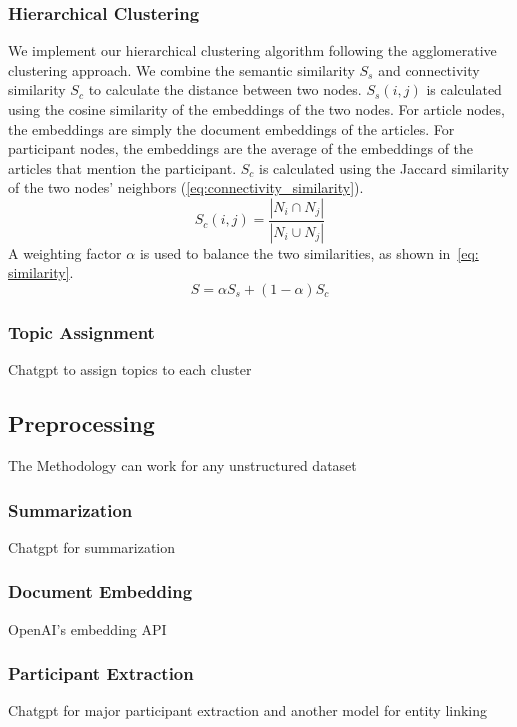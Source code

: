 \subsubsection{Hierarchical Clustering}\label{sec: clustering}
We implement our hierarchical clustering algorithm following the agglomerative clustering approach.
We combine the semantic similarity $S_s$ and connectivity similarity $S_c$ to calculate the distance between two nodes.
$S_s(i, j)$ is calculated using the cosine similarity of the embeddings of the two nodes.
For article nodes, the embeddings are simply the document embeddings of the articles.
For participant nodes, the embeddings are the average of the embeddings of the articles that mention the participant.
$S_c$ is calculated using the Jaccard similarity of the two nodes' neighbors (\autoref{eq:connectivity_similarity}).
\begin{equation}\label{eq:connectivity_similarity}
    S_c(i, j) = \frac{|N_i \cap N_j|}{|N_i \cup N_j|}
\end{equation}
A weighting factor $\alpha$ is used to balance the two similarities, as shown in~\autoref{eq: similarity}.
\begin{equation}\label{eq: similarity}
    S = \alpha S_s + (1-\alpha) S_c
\end{equation}

\subsubsection{Topic Assignment}
Chatgpt to assign topics to each cluster

\subsection{Preprocessing}
The Methodology can work for any unstructured dataset
\subsubsection{Summarization}
Chatgpt for summarization
\subsubsection{Document Embedding}
OpenAI's embedding API
\subsubsection{Participant Extraction}\label{sec:participant_extraction}
Chatgpt for major participant extraction and another model for entity linking